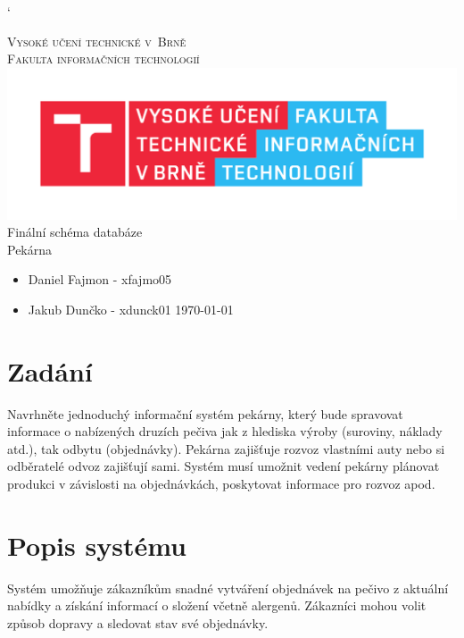 \documentclass[a4paper, 12pt]{article}
\begin{document}
\catcode`

\begin{titlepage}
		\begin{center}
			\Huge
			\textsc{Vysoké učení technické v~Brně} \\
			\huge
			\textsc{Fakulta informačních technologií} \\
			\includegraphics[scale=0.9]{img/FIT_barevne_CMYK_CZ.pdf} \\
			\Huge
			Finální schéma databáze \\
			\huge
			Pekárna
		\end{center}
		\begin{itemize}
		    \item[] \large{Daniel Fajmon - xfajmo05}
		    \item[] \large{Jakub Dunčko - xdunck01 \hfill \today}
		\end{itemize}
\end{titlepage}

\tableofcontents
\newpage

\section{Zadání}
Navrhněte jednoduchý informační systém pekárny, který bude spravovat informace o nabízených druzích pečiva jak z hlediska výroby (suroviny, náklady atd.), tak odbytu (objednávky). Pekárna zajišťuje rozvoz vlastními auty nebo si odběratelé odvoz zajišťují sami. Systém musí umožnit vedení pekárny plánovat produkci v závislosti na objednávkách, poskytovat informace pro rozvoz apod.

\section{Popis systému}
Systém umožňuje zákazníkům snadné vytváření objednávek na pečivo z aktuální nabídky a získání informací o složení včetně alergenů. Zákazníci mohou volit způsob dopravy a sledovat stav své objednávky.
\end{document}
